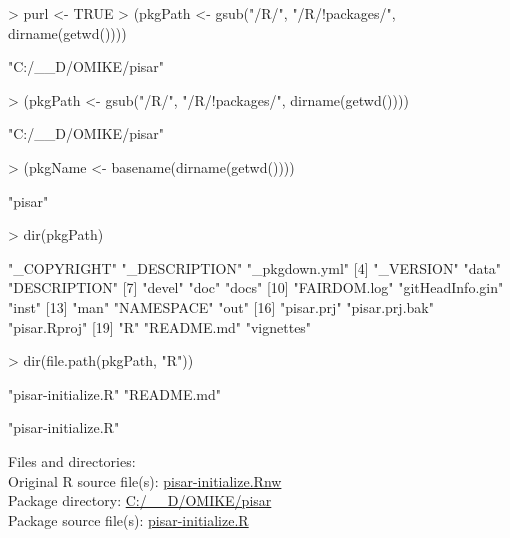 \documentclass[a4paper,12pt]{article}\usepackage[]{graphicx}\usepackage[]{color}
\begin{document}
\begin{Schunk}
\begin{Sinput}
> purl <- TRUE
> (pkgPath <- gsub("/R/", "/R/!packages/", dirname(getwd())))
\end{Sinput}
\begin{Soutput}
[1] "C:/__D/OMIKE/pisar"
\end{Soutput}
\begin{Sinput}
> (pkgPath <- gsub("/R/", "/R/!packages/", dirname(getwd())))
\end{Sinput}
\begin{Soutput}
[1] "C:/__D/OMIKE/pisar"
\end{Soutput}
\begin{Sinput}
> (pkgName <- basename(dirname(getwd())))
\end{Sinput}
\begin{Soutput}
[1] "pisar"
\end{Soutput}
\begin{Sinput}
> dir(pkgPath)
\end{Sinput}
\begin{Soutput}
 [1] "_COPYRIGHT"      "_DESCRIPTION"    "_pkgdown.yml"   
 [4] "_VERSION"        "data"            "DESCRIPTION"    
 [7] "devel"           "doc"             "docs"           
[10] "FAIRDOM.log"     "gitHeadInfo.gin" "inst"           
[13] "man"             "NAMESPACE"       "out"            
[16] "pisar.prj"       "pisar.prj.bak"   "pisar.Rproj"    
[19] "R"               "README.md"       "vignettes"      
\end{Soutput}
\begin{Sinput}
> dir(file.path(pkgPath, "R"))
\end{Sinput}
\begin{Soutput}
[1] "pisar-initialize.R" "README.md"         
\end{Soutput}
\begin{Soutput}
[1] "pisar-initialize.R"
\end{Soutput}
\end{Schunk}

Files and directories:\\[12pt]
Original R source file(s): \url{pisar-initialize.Rnw}\\
Package directory: \url{C:/__D/OMIKE/pisar}\\
Package source file(s): \url{pisar-initialize.R}
\end{document}
